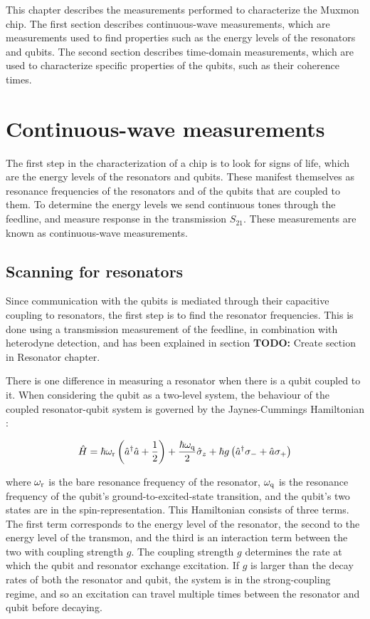    This chapter describes the measurements performed to characterize the Muxmon chip. The first section describes continuous-wave measurements, which are measurements used to find properties such as the energy levels of the resonators and qubits. The second section describes time-domain measurements, which are used to characterize specific properties of the qubits, such as their coherence times.

    \section{Continuous-wave measurements}

      The first step in the characterization of a chip is to look for signs of life, which are the energy levels of the resonators and qubits. These manifest themselves as resonance frequencies of the resonators and of the qubits that are coupled to them. To determine the energy levels we send continuous tones through the feedline, and measure response in the transmission $S_{21}$. These measurements are known as continuous-wave measurements.

      \subsection{Scanning for resonators}
        \label{sec:resonator-scan}
        Since communication with the qubits is mediated through their capacitive coupling to resonators, the first step is to find the resonator frequencies. This is done using a transmission measurement of the feedline, in combination with heterodyne detection, and has been explained in section \textbf{TODO:} Create section in Resonator chapter.

        There is one difference in measuring a resonator when there is a qubit coupled to it. When considering the qubit as a two-level system, the behaviour of the coupled resonator-qubit system is governed by the Jaynes-Cummings Hamiltonian \cite{koch2007Transmon}:

        \begin{equation}
          \hat{H} = \hbar \omega_\text{r}\left(\hat{a}^\dagger \hat{a} + \frac{1}{2} \right) + \frac{\hbar \omega_\text{q}}{2}\hat{\sigma}_z + \hbar g \left(\hat{a}^\dagger \sigma_{-} + \hat{a}\sigma_{+}\right)
          \label{eq:Jaynes-Cummings}
        \end{equation}

        where $\omega_\text{r}$ is the bare resonance frequency of the resonator, $\omega_\text{q}$ is the resonance frequency of the qubit's ground-to-excited-state transition, and the qubit's two states are in the spin-representation. This Hamiltonian consists of three terms. The first term corresponds to the energy level of the resonator, the second to the energy level of the transmon, and the third is an interaction term between the two with coupling strength $g$. The coupling strength $g$ determines the rate at which the qubit and resonator exchange excitation. If $g$ is larger than the decay rates of both the resonator and qubit, the system is in the strong-coupling regime, and so an excitation can travel multiple times between the resonator and qubit before decaying.


